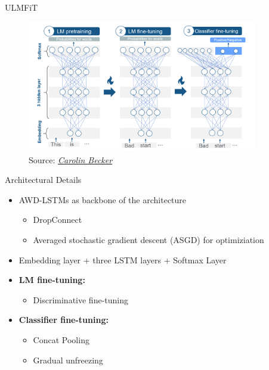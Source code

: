 
\begin{vbframe}{ULMFiT \href{https://www.aclweb.org/anthology/P18-1031.pdf}{}}

\vfill

	\begin{figure}
		\centering
		\includegraphics[width = 10cm]{figure/ulmfit-overview-new}\\ 
		\footnotesize{Source:} \href{https://slds-lmu.github.io/seminar_nlp_ss20/transfer-learning-for-nlp-i.html}{\footnotesize \it Carolin Becker}
	\end{figure}

\vfill

\end{vbframe}


\begin{vbframe}{Architectural Details}

\vfill

	\begin{itemize}
		\item AWD-LSTMs \href{https://arxiv.org/pdf/1708.02182.pdf}{} as backbone of the architecture
			\begin{itemize}
				\item DropConnect \href{http://proceedings.mlr.press/v28/wan13.pdf}{}
				\item Averaged stochastic gradient descent (ASGD) for optimiziation
			\end{itemize}
		\item Embedding layer + three LSTM layers + Softmax Layer
		\item \textbf{LM fine-tuning:}
			\begin{itemize}
				\item Discriminative fine-tuning 
			\end{itemize}
		\item \textbf{Classifier fine-tuning:}
			\begin{itemize}
				\item Concat Pooling
				\item Gradual unfreezing
			\end{itemize}
	\end{itemize}

\vfill

\end{vbframe}

